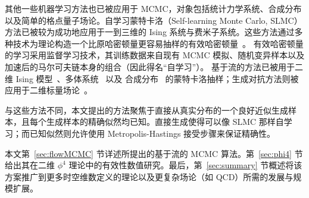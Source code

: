 其他一些机器学习方法也已被应用于 MCMC，对象包括统计力学系统、合成分布以及简单的格点量子场论。自学习蒙特卡洛（Self-learning Monte Carlo, SLMC）方法已被较为成功地应用于一到三维的 Ising 系统与费米子系统。这些方法通过多种技术为理论构造一个比原哈密顿量更容易抽样的有效哈密顿量~\cite{Huang2017,Liu2017SLMC,Liu2016SLMCFermion, Nagai2017SLMCCT,Shen2018SLMCDNN}。
有效哈密顿量的学习采用监督学习技术，其训练数据来自现有 MCMC 模拟、随机变异样本以及加速后的马尔可夫链本身的组合（因此得名``自学习''）。
基于流的方法已被用于二维 Ising 模型~\cite{Li2018}、多体系统~\cite{NoeBoltzmannGenerators2018} 以及
合成分布~\cite{Song2017,Levy2017GenHMC} 的蒙特卡洛抽样；生成对抗方法则被应用于二维标量场论~\cite{Urban2018,Zhou2018}。

与这些方法不同，本文提出的方法聚焦于直接从真实分布的一个良好近似生成样本，且每个生成样本的精确似然均已知。直接生成使得可以像 SLMC 那样自学习；而已知似然则允许使用 Metropolis-Hastings 接受步骤来保证精确性。


本文第~\ref{sec:flowMCMC} 节详述所提出的基于流的 MCMC 算法。第~\ref{sec:phi4} 节给出其在二维 $\phi^4$ 理论中的有效性数值研究。最后，第~\ref{sec:summary} 节概述将该方案推广到更多时空维数定义的理论以及更复杂场论（如 QCD）所需的发展与规模扩展。
